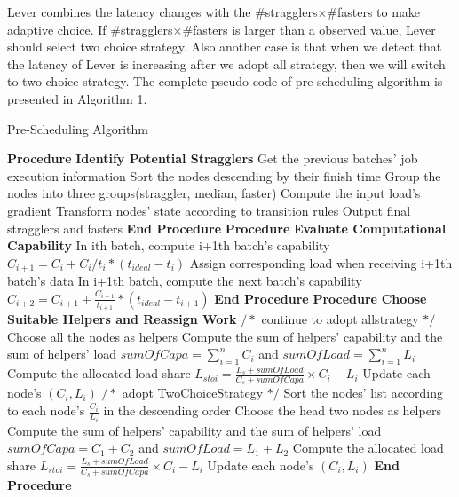   Lever combines the latency changes with the \#stragglers$\times$\#fasters to make adaptive choice. If \#stragglers$\times$\#fasters is larger than a observed value, Lever should select two choice strategy. Also another case is that when we detect that the latency of Lever is increasing after we adopt all strategy, then we will switch to two choice strategy. The complete pseudo code of pre-scheduling algorithm is presented in Algorithm 1.
  \begin{algorithm}[htbp]
  \small
  \caption{Pre-Scheduling Algorithm}
  \label{Alg:1}
  \begin{algorithmic}[1]
  \STATE \textbf{Procedure} \textbf{Identify Potential Stragglers}
  \STATE \quad Get the previous batches' job execution information
  \STATE \quad Sort the nodes descending by their finish time
  \STATE \quad Group the nodes into three groups(straggler, median, faster)
  \STATE \quad Compute the input load's gradient
  \STATE \quad Transform nodes' state according to transition rules
  \STATE \quad Output final stragglers and fasters
  \STATE \textbf{End Procedure}
  \STATE \textbf{Procedure} \textbf{Evaluate Computational Capability}
  \STATE \quad In ith batch, compute i+1th batch's capability
  \STATE \quad $C_{i+1} = C_i + C_i/t_i*(t_{ideal}-t_i)$
  \STATE \quad Assign corresponding load when receiving i+1th batch's data
  \STATE \quad In i+1th batch, compute the next batch's capability
  \STATE \quad $C_{i+2} = C_{i+1} + \frac{C_{i+1}}{t_{i+1}}*(t_{ideal}-t_{i+1})$
  \STATE \textbf{End Procedure}
  \STATE \textbf{Procedure} \textbf{Choose Suitable Helpers and Reassign Work}
  \STATE $/*$ continue to adopt allstrategy $*/$
  \STATE Choose all the nodes as helpers
  \STATE Compute the sum of helpers' capability and the sum of helpers' load
  \STATE $sumOfCapa=\sum_{i=1}^n C_i$ and $sumOfLoad=\sum_{i=1}^n L_i$
  \STATE Compute the allocated load share
  \STATE $L_{stoi}=\frac{L_s + sumOfLoad}{C_s + sumOfCapa}\times C_i-L_i$
  \STATE Update each node's $(C_i,L_i)$
  \ENDFOR
  \ENDFOR
  \ELSE
  \STATE $/*$ adopt TwoChoiceStrategy $*/$
  \STATE Sort the nodes' list according to each node's $\frac{C_i}{L_i}$ in the descending order
  \STATE Choose the head two nodes as helpers
  \STATE Compute the sum of helpers' capability and the sum of helpers' load
  \STATE $sumOfCapa = C_1 + C_2$ and $sumOfLoad = L_1 + L_2$
  \STATE Compute the allocated load share
  \STATE $L_{stoi}=\frac{L_s + sumOfLoad}{C_s + sumOfCapa}\times C_i-L_i$
  \STATE Update each node's $(C_i,L_i)$
  \ENDFOR
  \ENDFOR
  \ENDIF
  \STATE \textbf{End Procedure}
  \end{algorithmic}
  \end{algorithm}